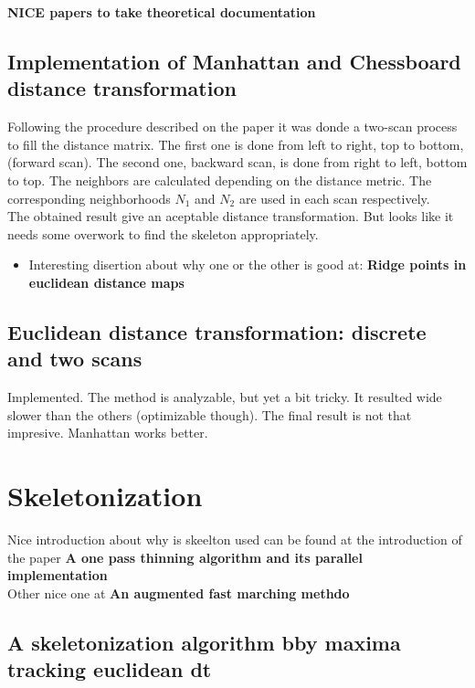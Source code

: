 \documentclass{article}
\begin{document}
\textbf{NICE papers to take theoretical documentation}

\subsection{Implementation of Manhattan and Chessboard distance transformation}
Following the procedure described on the paper it was donde a two-scan process
to fill the distance matrix. The first one is done from left to right, top to bottom,
(forward scan). The second one, backward scan, is done from right to left, bottom to top.
The neighbors are calculated depending on the distance metric. The corresponding 
neighborhoods $N_1$ and $N_2$ are used in each scan respectively.\\

The obtained result give an aceptable distance transformation. But looks like it
needs some overwork to find the skeleton appropriately.

\begin{itemize}
\item Interesting disertion about why one or the other is good at:
 \textbf{ Ridge points in euclidean distance maps}
\end{itemize}

\subsection{Euclidean distance transformation: discrete and two scans}

Implemented. The method is analyzable, but yet a bit tricky. It resulted
wide slower than the others (optimizable though). The final result is not that
impresive. Manhattan works better.


\section{Skeletonization}

Nice introduction about why is skeelton used can be found at the introduction
of the paper \textbf{A one pass thinning algorithm and its parallel
implementation}\\

Other nice one at \textbf{An augmented fast marching methdo}

\subsection{A skeletonization algorithm bby maxima tracking euclidean dt}
\end{document}
